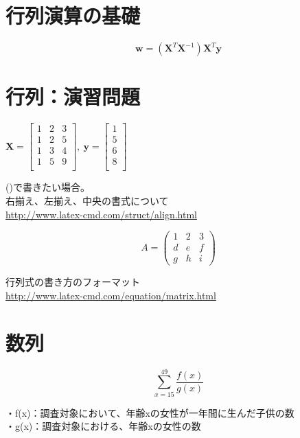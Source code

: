 \documentclass[a4paper,11pt]{jsarticle}
\begin{document}
\newpage
\section{行列演算の基礎}

\begin{equation}
    \boldsymbol{w} = (\boldsymbol{X}^{T}\boldsymbol{X}^{-1})\boldsymbol{X}^{T}\boldsymbol{y}
\end{equation}

    \section{行列：演習問題}
    \centering
    $\boldsymbol{X} = \begin{bmatrix}
      1 & 2 & 3 \\
      1 & 2 & 5 \\
      1 & 3 & 4 \\
      1 & 5 & 9 \\
    \end{bmatrix}
    ,\ \boldsymbol{y} = \begin{bmatrix}
      1\\
      5\\
      6\\
      8\\
    \end{bmatrix}
    $
    \
    \
    \begin{flushleft}
      ()で書きたい場合。\\
      右揃え、左揃え、中央の書式について\\
      \underline{http://www.latex-cmd.com/struct/align.html}
    \end{flushleft}
    

    \[
        A = \left(
          \begin{array}{ccc}
            1 & 2 & 3 \\
            d & e & f \\
            g & h & i
          \end{array}
        \right)
    \]
    \begin{flushleft}
      行列式の書き方のフォーマット\\
      \underline{http://www.latex-cmd.com/equation/matrix.html} 
    \end{flushleft}

    \newpage
    \section{数列}
    \begin{equation}
      \sum_{x = 15}^{49} \frac{f(x)}{g(x)}
    \end{equation}
    \begin{flushleft}
    ・f(x)：調査対象において、年齢xの女性が一年間に生んだ子供の数\\
    ・g(x)：調査対象における、年齢xの女性の数
    \end{flushleft}
\end{document}
